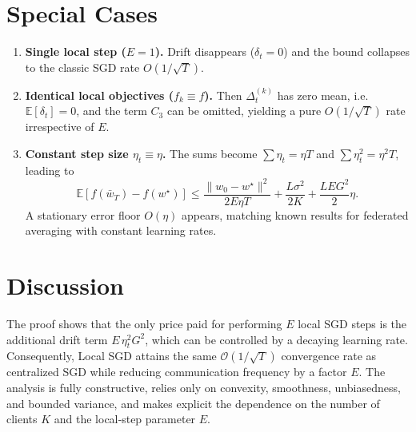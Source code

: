 \documentclass[11pt]{article}
\newcommand{\E}{\mathbb{E}}
\begin{document}
\section*{Special Cases}
\begin{enumerate}[label={\bf S\arabic*}:, leftmargin=*]
\item \textbf{Single local step ($E=1$).}  
Drift disappears ($\delta_t=0$) and the bound collapses to the classic SGD rate $O(1/\sqrt{T})$.

\item \textbf{Identical local objectives ($f_k\equiv f$).}  
Then $\Delta_{t}^{(k)}$ has zero mean, i.e. $\E[\delta_t]=0$, and the term $C_3$ can be omitted, yielding a pure $O(1/\sqrt{T})$ rate irrespective of $E$.

\item \textbf{Constant step size $\eta_t\equiv \eta$.}  
The sums become $\sum\eta_t = \eta T$ and $\sum\eta_t^{2}= \eta^{2}T$, leading to
\[
\E[f(\bar w_T)-f(w^\star)]\le
\frac{\|w_0-w^\star\|^{2}}{2E\eta T}
+ \frac{L\sigma^{2}}{2K}
+ \frac{L E G^{2}}{2}\eta .
\]
A stationary error floor $O(\eta)$ appears, matching known results for federated averaging with constant learning rates.
\end{enumerate}

\section*{Discussion}
The proof shows that the only price paid for performing $E$ local SGD steps is the additional drift term $E\,\eta_t^{2}G^{2}$, which can be controlled by a decaying learning rate. Consequently, Local SGD attains the same $\mathcal{O}(1/\sqrt{T})$ convergence rate as centralized SGD while reducing communication frequency by a factor $E$. The analysis is fully constructive, relies only on convexity, smoothness, unbiasedness, and bounded variance, and makes explicit the dependence on the number of clients $K$ and the local‑step parameter $E$.
\end{document}
